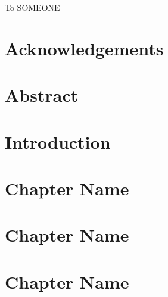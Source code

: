 







\newpage
\thispagestyle{empty}
\vspace*{\fill}
\begin{center}
    {\large
        To SOMEONE
    }
\end{center}
\vspace*{\fill}

\chapter*{Acknowledgements}
\label{ch:ack}


\chapter*{Abstract}
\label{ch:abstract}


\tableofcontents
\listoffigures
\listoftables
\startDocument

\chapter{Introduction}
\label{ch:intro}


\chapter{Chapter Name}
\label{ch:chap2}


\chapter{Chapter Name}
\label{ch:chap3}


\chapter{Chapter Name}
\label{ch:chap4}


